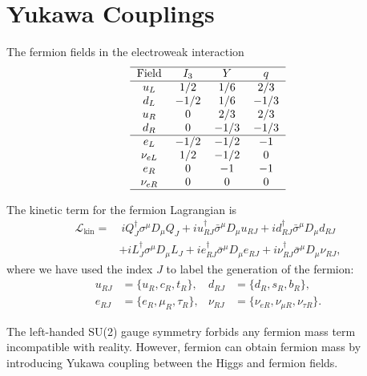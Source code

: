 \documentclass[aps,rmp,twocolumn,superscriptaddress,nofootinbib]{revtex4-2}
\begin{document}
\section{Yukawa Couplings}
The fermion fields in the electroweak interaction
\begin{equation}
	\begin{tabular}{c c c c}
		\hline 
		Field & $I_3$ & $Y$ & $q$\\ \hline
		$u_L$ & $1/2$ & $1/6$ & $2/3$ \\ 
		$d_L$ & $-1/2$ & $1/6$ & $-1/3$ \\  
		$u_R$ & $0$ & $2/3$ & $2/3$ \\
		$d_R$ & $0$ & $-1/3$ & $-1/3$ \\ \hline
		$e_L$ & $-1/2$ & $-1/2$ & $-1$ \\ 
		$\nu_{eL}$ & $1/2$ & $-1/2$ & $0$ \\  
		$e_R$ & $0$ & $-1$ & $-1$ \\
		$\nu_{eR}$ & $0$ & $0$ & $0$ \\
		\hline 
	\end{tabular}
\end{equation}

The kinetic term for the fermion Lagrangian is
\begin{equation*}
\begin{aligned}
	\mathcal L_{\mathrm{kin}}
	=&\ i Q^\dagger_J \sigma^\mu D_\mu Q_J + i u_{RJ}^\dagger \bar\sigma^\mu D_\mu u_{RJ} + i d_{RJ}^\dagger \bar\sigma^\mu D_\mu d_{RJ} \\
	& + i L^\dagger_J \sigma^\mu D_\mu L_J + i e_{RJ}^\dagger \bar\sigma^\mu D_\mu e_{RJ} + i \nu_{RJ}^\dagger \bar\sigma^\mu D_\mu \nu_{RJ},
\end{aligned}
\end{equation*}
where we have used the index $J$ to label the generation of the fermion:
\begin{equation}
\begin{aligned}
	u_{RJ} &= \{u_R, c_R, t_R\}, & 
	d_{RJ} &= \{d_R, s_R, b_R\}, \\
	e_{RJ} &= \{e_R, \mu_R, \tau_R\}, &
	\nu_{RJ} &= \{\nu_{eR},\nu_{\mu R},\nu_{\tau R}\}.
\end{aligned}
\end{equation}

The left-handed SU(2) gauge symmetry forbids any fermion mass term incompatible with reality.
However, fermion can obtain fermion mass by introducing Yukawa coupling between the Higgs and fermion fields.
\end{document}
